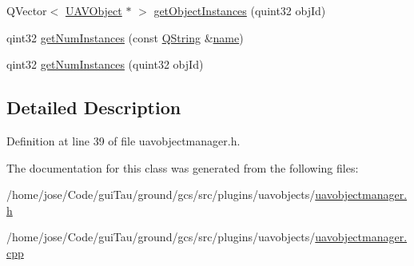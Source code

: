 \begin{DoxyCompactItemize}
\item 
Q\-Vector$<$ \hyperlink{class_u_a_v_object}{U\-A\-V\-Object} $\ast$ $>$ \hyperlink{group___u_a_v_objects_plugin_gaa1134c6f38b27868f8f61c6e2aaae4f5}{get\-Object\-Instances} (quint32 obj\-Id)
\item 
qint32 \hyperlink{group___u_a_v_objects_plugin_gab285ecd0299f701264d624cad6e51ef1}{get\-Num\-Instances} (const \hyperlink{group___u_a_v_objects_plugin_gab9d252f49c333c94a72f97ce3105a32d}{Q\-String} \&\hyperlink{glext_8h_ad977737dfc9a274a62741b9500c49a32}{name})
\item 
qint32 \hyperlink{group___u_a_v_objects_plugin_ga22601fef22bd4c4ba1c48e07b70e8ddb}{get\-Num\-Instances} (quint32 obj\-Id)
\end{DoxyCompactItemize}


\subsection{Detailed Description}


Definition at line 39 of file uavobjectmanager.\-h.



The documentation for this class was generated from the following files\-:\begin{DoxyCompactItemize}
\item 
/home/jose/\-Code/gui\-Tau/ground/gcs/src/plugins/uavobjects/\hyperlink{uavobjectmanager_8h}{uavobjectmanager.\-h}\item 
/home/jose/\-Code/gui\-Tau/ground/gcs/src/plugins/uavobjects/\hyperlink{uavobjectmanager_8cpp}{uavobjectmanager.\-cpp}\end{DoxyCompactItemize}
